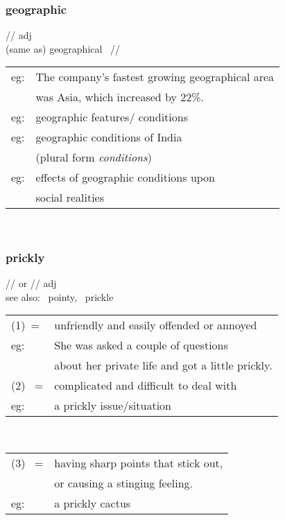 \documentclass[14pt, t]{beamer}
\begin{document}
\begin{frame}
\frametitle{geographic}
// \quad adj \\[2pt]
(same as) geographical \, // \\[4pt]
\begin{tabular}{ll}
eg: & The company's fastest growing geographical area \\
& was Asia, which increased by 22\%. \\[4pt]
eg: & geographic features/ conditions \\
eg: & geographic conditions of India \\
& (plural form {\it conditions}) \\[4pt]
eg: & effects of geographic conditions upon\\
& social realities \\
\end{tabular} \\
\end{frame}
\begin{frame}[allowframebreaks]
\frametitle{prickly}
//  or // \quad adj \\[2pt]
see also: \, pointy, \, prickle \\[4pt]
\begin{tabular}{ll}
(1)\, = & unfriendly and easily offended or annoyed \\[2pt]
eg: & She was asked a couple of questions \\
& about her private life and got a little prickly. \\[8pt]
(2) \, =& complicated and difficult to deal with \\[2pt]
eg: & a prickly issue/situation \\
\end{tabular} \\ 
\framebreak
\begin{tabular}{ll}
(3) \, =& having sharp points that stick out, \\
& or causing a stinging feeling. \\[2pt]
eg: & a prickly cactus \\
\end{tabular} \\
\end{frame}
\end{document}
